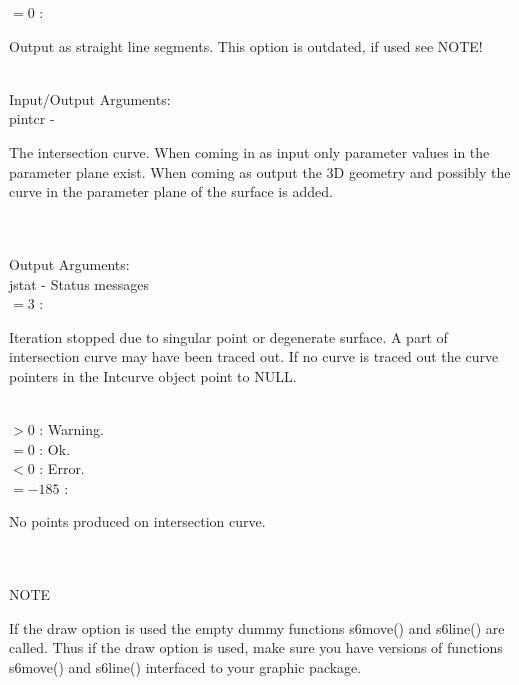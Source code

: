                     \>\>\>\>\> $= 0$ \> : \begin{minipg5}
                                             Output as straight line
                                             segments. This option is
                                             outdated, if used see NOTE!
                                          \end{minipg5}\\[0.8ex]
\newpagetabs
        \>Input/Output Arguments:\\
        \>\>    {\fov pintcr}\> - \>  \begin{minipg2}
                     The intersection curve. When coming in as input
                       only parameter values in the parameter plane
                       exist. When coming as output the 3D geometry
                       and possibly the curve in the parameter plane
                       of the surface is added.
                               \end{minipg2}\\[0.8ex]
\\
        \>Output Arguments:\\
        \>\>    {\fov jstat}     \> - \> Status messages\\
        \>\>\>\> $= 3$ \> :
                \begin{minipg5}
                  Iteration stopped due to singular
                  point or degenerate surface. A part
                  of intersection curve may have been
                  traced out. If no curve is traced out
                  the curve pointers in the Intcurve
                  object point to NULL.
                \end{minipg5}\\[0.8ex]
        \>\>\>\> $> 0$ \>\> : Warning.\\
        \>\>\>\> $= 0$ \>\> : Ok.\\
        \>\>\>\> $< 0$ \>\> : Error.\\
        \>\>\>\> $= -185$ \>\> :
        \begin{minipg5}
          No points produced on intersection curve.
        \end{minipg5}\\[0.8ex]
\\
NOTE\\
\>      \begin{minipg6}
If the draw option is used the empty dummy functions s6move() and
s6line() are called.
Thus if the draw option is used, make sure
you have versions of functions s6move() and s6line() interfaced to your graphic package.
\end{minipg6}\\
